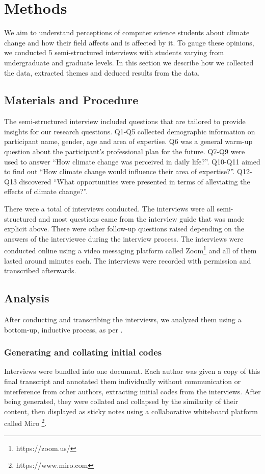 

\section{Methods}

We aim to understand perceptions of computer science students about climate change and how their field affects and is affected by it. To gauge these opinions, we conducted 5 semi-structured interviews with students varying from undergraduate and graduate levels. In this section we describe how we collected the data, extracted themes and deduced results from the data.

\subsection{Materials and Procedure}
The semi-structured interview included  questions that are tailored to provide insights for our research questions. Q1-Q5 collected demographic information on participant name, gender, age and area of expertise. Q6 was a general warm-up question about the participant’s professional plan for the future. Q7-Q9 were used to answer “How climate change was perceived in daily life?”. Q10-Q11 aimed to find out “How climate change would influence their area of expertise?”. Q12-Q13 discovered “What opportunities were presented in terms of alleviating the effects of climate change?”. 

There were a total of  interviews conducted. The interviews were all semi-structured and most questions came from the interview guide that was made explicit above. There were other follow-up questions raised depending on the answers of the interviewee during the interview process. The interviews were conducted online using a video messaging platform called Zoom\footnote{https://zoom.us/} and all of them lasted around  minutes each. The interviews were recorded with permission and transcribed afterwards. 
\subsection{Analysis}
After conducting and transcribing the interviews, we analyzed them using a bottom-up, inductive process, as per \citet{braun2006using}.

\subsubsection{Generating and collating initial codes} Interviews were bundled into one document. Each author was given a copy of this final transcript and annotated them individually without communication or interference from other authors, extracting initial codes from the interviews. After being generated, they were collated and collapsed by the similarity of their content, then displayed as sticky notes using a collaborative whiteboard platform called Miro \footnote{https://www.miro.com}. %

